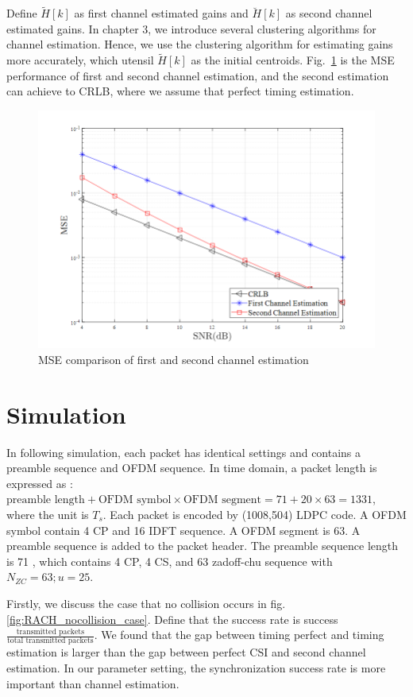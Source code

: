 Define $\tilde{H}[k]$ as first channel estimated gains and $\breve{H}[k]$ as second channel estimated gains. In chapter 3, we introduce several clustering algorithms for channel estimation. Hence, we use the clustering algorithm for estimating gains more accurately, which utensil $\tilde{H}[k]$ as the initial centroids. Fig.~\ref{fig:RACH_mse} is the MSE performance of first and second channel estimation, and the second estimation can achieve to CRLB, where we assume that perfect timing estimation.

\begin{figure}[t!]
 \centering
 \includegraphics[width=15cm]{fig/RACH_mse.png}
 \caption{MSE comparison of first and second channel estimation}
 \label{fig:RACH_mse}
\end{figure}

\section{Simulation}

In following simulation, each packet has identical settings and contains a preamble sequence and OFDM sequence. In time domain, a packet length is expressed as : $\text{preamble length} + \text{OFDM symbol} \times \text{OFDM segment} = 71 + 20 \times 63 = 1331$, where the unit is $T_s$. Each packet is encoded by (1008,504) LDPC code. A OFDM symbol contain 4 CP and 16 IDFT sequence. A OFDM segment is 63. A preamble sequence is added to the packet header. The preamble sequence length is 71 , which contains 4 CP, 4 CS, and 63 zadoff-chu sequence with $N_{ZC}=63; u=25$.

Firstly, we discuss the case that no collision occurs in fig.\ref{fig:RACH_nocollision_case}. Define that the success rate is success $\frac{\text{transmitted packets}} {\text{total transmitted packets}}$. We found that the gap between timing perfect and timing estimation is larger than the gap between perfect CSI and second channel estimation. In our parameter setting, the synchronization success rate is more important than channel estimation. 

